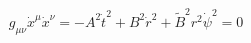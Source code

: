 \begin{equation}
g_{\mu\nu} \dot{x}^{\mu}\dot{x}^{\nu}=
-A^{2}\dot{t}^{2}+B^{2}\dot{r}^{2}
+\tilde{B}^{2}r^{2}\dot{\psi}^{2}
=0
\end{equation}

